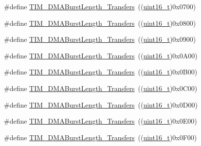\begin{DoxyCompactItemize}
\item 
\#define \hyperlink{group___t_i_m___d_m_a___burst___length_ga8a760d7114425596736b0ecdbe5fdea6}{T\+I\+M\+\_\+\+D\+M\+A\+Burst\+Length\+\_\+Transfers}~((\hyperlink{_p_e___types_8h_a1f1825b69244eb3ad2c7165ddc99c956}{uint16\+\_\+t})0x0700)
\item 
\#define \hyperlink{group___t_i_m___d_m_a___burst___length_ga98b208205c133557a9d67a0921559a66}{T\+I\+M\+\_\+\+D\+M\+A\+Burst\+Length\+\_\+Transfers}~((\hyperlink{_p_e___types_8h_a1f1825b69244eb3ad2c7165ddc99c956}{uint16\+\_\+t})0x0800)
\item 
\#define \hyperlink{group___t_i_m___d_m_a___burst___length_ga2fc09f2148cf6ebddc8e67116212259c}{T\+I\+M\+\_\+\+D\+M\+A\+Burst\+Length\+\_\+Transfers}~((\hyperlink{_p_e___types_8h_a1f1825b69244eb3ad2c7165ddc99c956}{uint16\+\_\+t})0x0900)
\item 
\#define \hyperlink{group___t_i_m___d_m_a___burst___length_ga0ca63a3caeaf1e85bd54961891949de7}{T\+I\+M\+\_\+\+D\+M\+A\+Burst\+Length\+\_\+Transfers}~((\hyperlink{_p_e___types_8h_a1f1825b69244eb3ad2c7165ddc99c956}{uint16\+\_\+t})0x0\+A00)
\item 
\#define \hyperlink{group___t_i_m___d_m_a___burst___length_ga9160d52913bbd7ad1e663ff943d01852}{T\+I\+M\+\_\+\+D\+M\+A\+Burst\+Length\+\_\+Transfers}~((\hyperlink{_p_e___types_8h_a1f1825b69244eb3ad2c7165ddc99c956}{uint16\+\_\+t})0x0\+B00)
\item 
\#define \hyperlink{group___t_i_m___d_m_a___burst___length_ga11485e9eee8a6a7edc1df868755eab85}{T\+I\+M\+\_\+\+D\+M\+A\+Burst\+Length\+\_\+Transfers}~((\hyperlink{_p_e___types_8h_a1f1825b69244eb3ad2c7165ddc99c956}{uint16\+\_\+t})0x0\+C00)
\item 
\#define \hyperlink{group___t_i_m___d_m_a___burst___length_gab1a097ca7404e518839df99795443fb0}{T\+I\+M\+\_\+\+D\+M\+A\+Burst\+Length\+\_\+Transfers}~((\hyperlink{_p_e___types_8h_a1f1825b69244eb3ad2c7165ddc99c956}{uint16\+\_\+t})0x0\+D00)
\item 
\#define \hyperlink{group___t_i_m___d_m_a___burst___length_gad13373f5fd246557a4fc487dc43c37ec}{T\+I\+M\+\_\+\+D\+M\+A\+Burst\+Length\+\_\+Transfers}~((\hyperlink{_p_e___types_8h_a1f1825b69244eb3ad2c7165ddc99c956}{uint16\+\_\+t})0x0\+E00)
\item 
\#define \hyperlink{group___t_i_m___d_m_a___burst___length_gafb644e6033f7b46c602b02754b69fde0}{T\+I\+M\+\_\+\+D\+M\+A\+Burst\+Length\+\_\+Transfers}~((\hyperlink{_p_e___types_8h_a1f1825b69244eb3ad2c7165ddc99c956}{uint16\+\_\+t})0x0\+F00)
\item 

\end{DoxyCompactItemize}
